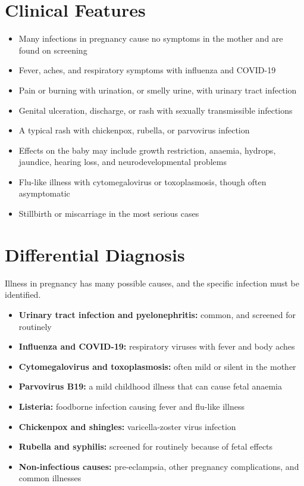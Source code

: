 \section*{Clinical Features}
\begin{itemize}
    \item Many infections in pregnancy cause no symptoms in the mother and are found on screening
    \item Fever, aches, and respiratory symptoms with influenza and COVID-19
    \item Pain or burning with urination, or smelly urine, with urinary tract infection
    \item Genital ulceration, discharge, or rash with sexually transmissible infections
    \item A typical rash with chickenpox, rubella, or parvovirus infection
    \item Effects on the baby may include growth restriction, anaemia, hydrops, jaundice, hearing loss, and neurodevelopmental problems
    \item Flu-like illness with cytomegalovirus or toxoplasmosis, though often asymptomatic
    \item Stillbirth or miscarriage in the most serious cases
\end{itemize}

\section*{Differential Diagnosis}
Illness in pregnancy has many possible causes, and the specific infection must be identified.
\begin{itemize}
    \item \textbf{Urinary tract infection and pyelonephritis:} common, and screened for routinely
    \item \textbf{Influenza and COVID-19:} respiratory viruses with fever and body aches
    \item \textbf{Cytomegalovirus and toxoplasmosis:} often mild or silent in the mother
    \item \textbf{Parvovirus B19:} a mild childhood illness that can cause fetal anaemia
    \item \textbf{Listeria:} foodborne infection causing fever and flu-like illness
    \item \textbf{Chickenpox and shingles:} varicella-zoster virus infection
    \item \textbf{Rubella and syphilis:} screened for routinely because of fetal effects
    \item \textbf{Non-infectious causes:} pre-eclampsia, other pregnancy complications, and common illnesses
\end{itemize}

